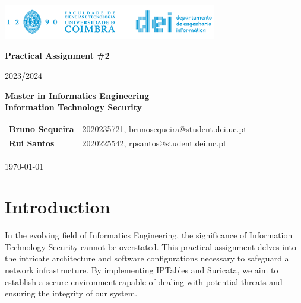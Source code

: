 \documentclass{article}
\begin{document}
\begin{titlepage}

        \centering
    \vspace*{1cm}

    \includegraphics[width=0.7\textwidth]{dei_thumb.png} %

    \vspace{1.5cm}
    {\LARGE \textbf{Practical Assignment \#2
} \par}
    \vspace{0.5cm}
    {\Large 2023/2024\par}

    \vspace{2.5cm}
    \textbf{Master in Informatics Engineering} \\
    \textbf{Information Technology Security} \par
    \vspace{2cm}
    \vspace{6cm}
    \begin{tabular}{ll}
        \textbf{Bruno Sequeira} & 2020235721, brunosequeira@student.dei.uc.pt \\
        \textbf{Rui Santos} & 2020225542, rpsantos@student.dei.uc.pt
        \\
    \end{tabular}

        
    \vfill
    {\large \today \par}
    \clearpage
    \tableofcontents
    \clearpage
    \listoffigures
    \clearpage
    
\end{titlepage}



\section{Introduction}
\texttt{}\par In the evolving field of Informatics Engineering, the significance of Information Technology Security cannot be overstated. This practical assignment delves into the intricate architecture and software configurations necessary to safeguard a network infrastructure. By implementing IPTables and Suricata, we aim to establish a secure environment capable of dealing with potential threats and ensuring the integrity of our system.
\end{document}
